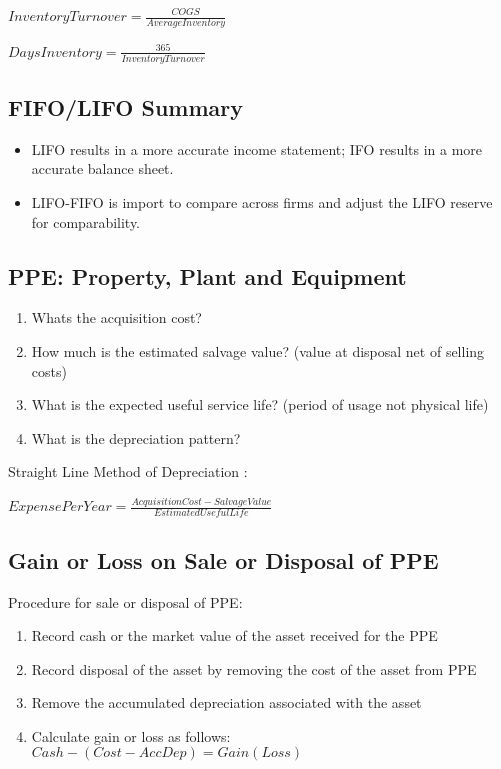 $InventoryTurnover = \frac{COGS}{AverageInventory}$ \

$DaysInventory = \frac{365}{InventoryTurnover}$ \

\subsection*{FIFO/LIFO Summary}

\begin{itemize}[noitemsep,topsep=0pt]
	\item LIFO results in a more accurate income statement; IFO results in a more accurate balance sheet.
	\item LIFO-FIFO is import to compare across firms and adjust the LIFO reserve for comparability.
\end{itemize}


\subsection*{PPE: Property, Plant and Equipment}

\begin{enumerate}[noitemsep,topsep=0pt]
	\item Whats the acquisition cost?
	\item How much is the estimated salvage value? (value at disposal net of selling costs)
	\item What is the expected useful service life? (period of usage not physical life)
	\item What is the depreciation pattern?
\end{enumerate}
	
Straight Line Method of Depreciation : 

$ExpensePerYear = \frac{AcquisitionCost - SalvageValue}{EstimatedUsefulLife}$ \


\subsection*{Gain or Loss on Sale or Disposal of PPE}
Procedure for sale or disposal of PPE:
\begin{enumerate}[noitemsep,topsep=0pt]
	\item Record cash or the market value of the asset received for the PPE
	\item Record disposal of the asset by removing the cost of the asset from PPE
	\item Remove the accumulated depreciation associated with the asset
	\item Calculate gain or loss as follows: \\  
	$ Cash - (Cost - AccDep) = Gain (Loss) $
\end{enumerate}


